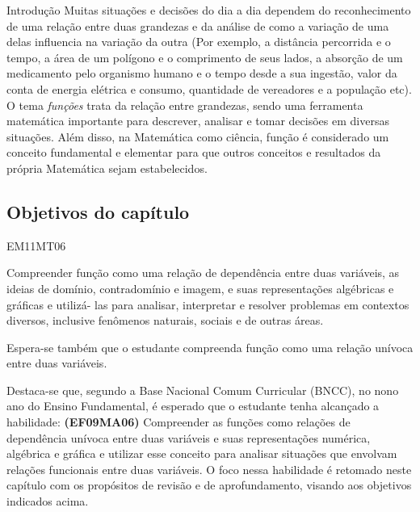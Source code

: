 \begin{apresentacao}{Introdução}
Muitas situações e decisões do dia a dia dependem do reconhecimento de uma relação entre duas grandezas e da análise de como a variação de uma delas influencia na variação da outra (Por exemplo, a distância percorrida e o tempo, a área de um polígono e o comprimento de seus lados, a absorção de um medicamento pelo organismo humano e o tempo desde a sua ingestão, valor da conta de energia elétrica e consumo, quantidade de vereadores e a população etc). O tema \textit{funções} trata da relação entre grandezas, sendo uma ferramenta matemática importante para descrever, analisar e tomar decisões em diversas situações. Além disso, na Matemática como ciência, função é considerado um conceito fundamental e elementar para que outros conceitos e resultados da própria Matemática sejam estabelecidos.

\subsection{Objetivos do capítulo}

\begin{habilities}{EM11MT06}

Compreender função como uma relação de dependência entre duas variáveis, as ideias de domínio, contradomínio e imagem, e suas representações algébricas e gráficas e utilizá- las para analisar, interpretar e resolver problemas em contextos diversos, inclusive fenômenos naturais, sociais e de outras áreas.

Espera-se também que o estudante compreenda função como uma relação unívoca entre duas variáveis.
\end{habilities}

Destaca-se que, segundo a Base Nacional Comum Curricular (BNCC), no nono ano do Ensino Fundamental, é esperado que o estudante tenha alcançado a habilidade: \textbf{(EF09MA06)} Compreender as funções como relações de dependência unívoca entre duas variáveis e suas representações numérica, algébrica e gráfica e utilizar esse conceito para analisar situações que envolvam relações funcionais entre duas variáveis. O foco nessa habilidade é retomado neste capítulo com os propósitos de revisão e de aprofundamento, visando aos objetivos indicados acima.


\end{apresentacao}
